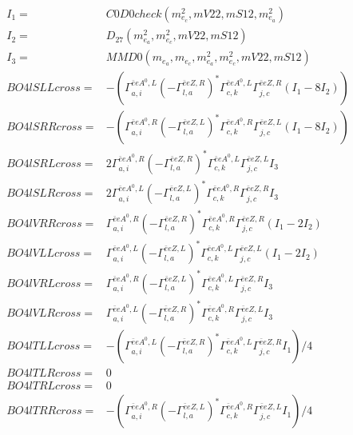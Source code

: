 \documentclass[A4,landscape]{article}
\begin{document}
\begin{align} 
I_1 = & C0D0check(m^2_{e_{{c}}}, mV22, mS12, m^2_{e_{{a}}}) \\ 
I_2 = & D_{27}(m^2_{e_{{a}}}, m^2_{e_{{c}}}, mV22, mS12) \\ 
I_3 = & MMD0(m_{e_{{a}}}, m_{e_{{c}}}, m^2_{e_{{a}}}, m^2_{e_{{c}}}, mV22, mS12) \\ 
  BO4lSLLcross= & -( \Gamma^{\bar{e}e A^0 ,L}_{a, i} (- \Gamma^{\bar{e}e Z ,R} _{l, a})^* \Gamma^{\bar{e}e A^0 ,L}_{c, k} \Gamma^{\bar{e}e Z ,R}_{j, c} (I_1 - 8 I_2)) \\ 
  BO4lSRRcross= & -( \Gamma^{\bar{e}e A^0 ,R}_{a, i} (- \Gamma^{\bar{e}e Z ,L} _{l, a})^* \Gamma^{\bar{e}e A^0 ,R}_{c, k} \Gamma^{\bar{e}e Z ,L}_{j, c} (I_1 - 8 I_2)) \\ 
  BO4lSRLcross= & 2  \Gamma^{\bar{e}e A^0 ,R}_{a, i} (- \Gamma^{\bar{e}e Z ,R} _{l, a})^* \Gamma^{\bar{e}e A^0 ,L}_{c, k} \Gamma^{\bar{e}e Z ,L}_{j, c} I_3 \\ 
  BO4lSLRcross= & 2  \Gamma^{\bar{e}e A^0 ,L}_{a, i} (- \Gamma^{\bar{e}e Z ,L} _{l, a})^* \Gamma^{\bar{e}e A^0 ,R}_{c, k} \Gamma^{\bar{e}e Z ,R}_{j, c} I_3 \\ 
  BO4lVRRcross= &  \Gamma^{\bar{e}e A^0 ,R}_{a, i} (- \Gamma^{\bar{e}e Z ,R} _{l, a})^* \Gamma^{\bar{e}e A^0 ,R}_{c, k} \Gamma^{\bar{e}e Z ,R}_{j, c} (I_1 - 2 I_2) \\ 
  BO4lVLLcross= &  \Gamma^{\bar{e}e A^0 ,L}_{a, i} (- \Gamma^{\bar{e}e Z ,L} _{l, a})^* \Gamma^{\bar{e}e A^0 ,L}_{c, k} \Gamma^{\bar{e}e Z ,L}_{j, c} (I_1 - 2 I_2) \\ 
  BO4lVRLcross= &  \Gamma^{\bar{e}e A^0 ,R}_{a, i} (- \Gamma^{\bar{e}e Z ,L} _{l, a})^* \Gamma^{\bar{e}e A^0 ,L}_{c, k} \Gamma^{\bar{e}e Z ,R}_{j, c} I_3 \\ 
  BO4lVLRcross= &  \Gamma^{\bar{e}e A^0 ,L}_{a, i} (- \Gamma^{\bar{e}e Z ,R} _{l, a})^* \Gamma^{\bar{e}e A^0 ,R}_{c, k} \Gamma^{\bar{e}e Z ,L}_{j, c} I_3 \\ 
  BO4lTLLcross= & -( \Gamma^{\bar{e}e A^0 ,L}_{a, i} (- \Gamma^{\bar{e}e Z ,R} _{l, a})^* \Gamma^{\bar{e}e A^0 ,L}_{c, k} \Gamma^{\bar{e}e Z ,R}_{j, c} I_1)/4 \\ 
  BO4lTLRcross= & 0 \\ 
  BO4lTRLcross= & 0 \\ 
  BO4lTRRcross= & -( \Gamma^{\bar{e}e A^0 ,R}_{a, i} (- \Gamma^{\bar{e}e Z ,L} _{l, a})^* \Gamma^{\bar{e}e A^0 ,R}_{c, k} \Gamma^{\bar{e}e Z ,L}_{j, c} I_1)/4 \\ 
\end{align} 
\end{document}
